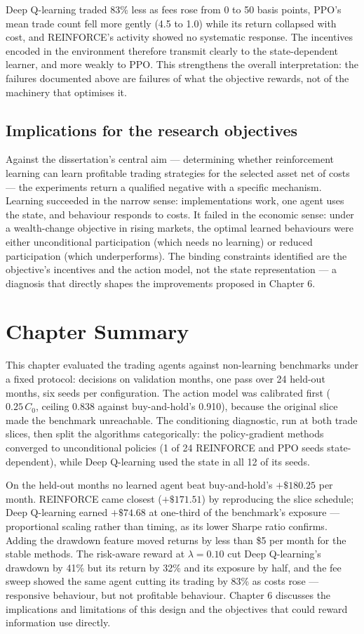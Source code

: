 Deep Q-learning traded 83\% less as fees rose from 0 to 50 basis points,
PPO's mean trade count fell more gently (4.5 to 1.0) while its return
collapsed with cost, and REINFORCE's activity showed no systematic
response. The incentives encoded in the environment therefore transmit
clearly to the state-dependent learner, and more weakly to PPO. This
strengthens the overall interpretation: the failures documented above
are failures of what the objective rewards, not of the machinery that
optimises it.

\subsection{Implications for the research objectives}

Against the dissertation's central aim --- determining whether
reinforcement learning can learn profitable trading strategies for the
selected asset net of costs --- the experiments return a qualified
negative with a specific mechanism. Learning succeeded in the narrow
sense: implementations work, one agent uses the state, and behaviour
responds to costs. It failed in the economic sense: under a wealth-change
objective in rising markets, the optimal learned behaviours were either
unconditional participation (which needs no learning) or reduced
participation (which underperforms). The binding constraints identified
are the objective's incentives and the action model, not the state
representation --- a diagnosis that directly shapes the improvements
proposed in Chapter 6.

\section{Chapter Summary}

This chapter evaluated the trading agents against non-learning benchmarks
under a fixed protocol: decisions on validation months, one pass over 24
held-out months, six seeds per configuration. The action model was
calibrated first ($0.25\,C_0$, ceiling 0.838 against buy-and-hold's
0.910), because the original slice made the benchmark unreachable. The
conditioning diagnostic, run at both trade slices, then split the
algorithms categorically: the policy-gradient methods converged to
unconditional policies (1 of 24 REINFORCE and PPO seeds state-dependent),
while Deep Q-learning used the state in all 12 of its seeds.

On the held-out months no learned agent beat buy-and-hold's $+\$180.25$
per month. REINFORCE came closest ($+\$171.51$) by reproducing the slice
schedule; Deep Q-learning earned $+\$74.68$ at one-third of the
benchmark's exposure --- proportional scaling rather than timing, as its
lower Sharpe ratio confirms. Adding the drawdown feature moved returns by
less than \$5 per month for the stable methods. The risk-aware reward at
$\lambda = 0.10$ cut Deep Q-learning's drawdown by 41\% but its return by
32\% and its exposure by half, and the fee sweep showed the same agent
cutting its trading by 83\% as costs rose --- responsive behaviour, but
not profitable behaviour. Chapter 6 discusses the implications and
limitations of this design and the objectives that could reward
information use directly.
